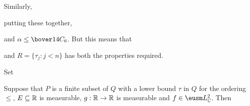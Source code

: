 {Similarly,


\noindent putting these together,


\noindent and $\alpha\le\bover14C_6$.   But this means that


\noindent and $R=\{\tau_j:j<n\}$ has both the properties required.
}%

 Set


\noindent Suppose that $P$ is a finite subset of $Q$ with a lower bound
$\tau$ in $Q$ for the ordering $\le$,
$E\subseteq\Bbb R$ is measurable,
$g:\Bbb R\to\Bbb R$ is measurable and $f\in\eusm L^2_{\Bbb C}$.   Then



